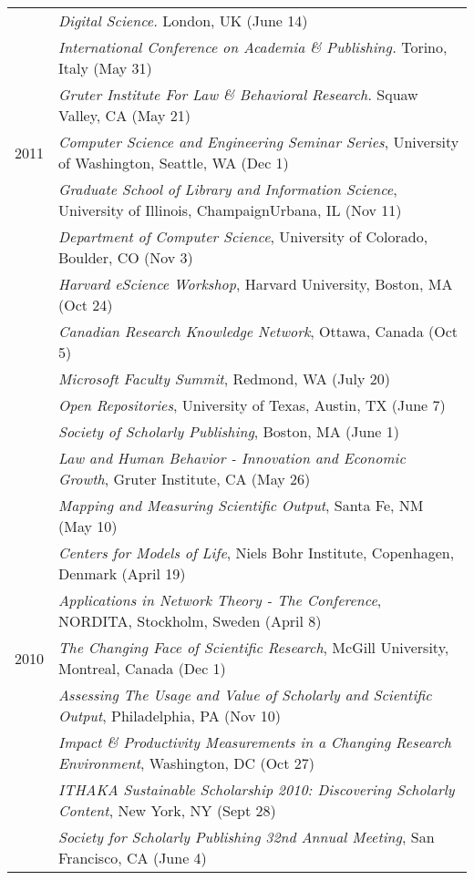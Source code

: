 \documentclass[11pt]{article}
\begin{document}
\begin{longtable}{p{0.5in}|p{5.5in}}
  		&  \textit{Digital Science.} London, UK (June 14) \\
  		&  \textit{International Conference on Academia \& Publishing.} Torino, Italy (May 31) \\
  		&  \textit{Gruter Institute For Law \& Behavioral Research.} Squaw Valley, CA (May 21) \\
  2011  &  \textit{Computer Science and Engineering Seminar Series}, University of Washington, Seattle, WA (Dec 1) \\
  		&  \textit{Graduate School of Library and Information Science}, University of Illinois, Champaign\textemdash Urbana, IL (Nov 11) \\
  		&  \textit{Department of Computer Science}, University of Colorado, Boulder, CO (Nov 3) \\
  		&  \textit{Harvard eScience Workshop}, Harvard University, Boston, MA (Oct 24) \\
  		&  \textit{Canadian Research Knowledge Network}, Ottawa, Canada (Oct 5) \\
  		&  \textit{Microsoft Faculty Summit}, Redmond, WA (July 20) \\
  		&  \textit{Open Repositories}, University of Texas, Austin, TX (June 7) \\
  		&  \textit{Society of Scholarly Publishing}, Boston, MA (June 1) \\
  		&  \textit{Law and Human Behavior - Innovation and Economic Growth}, Gruter Institute, CA (May 26) \\
  		&  \textit{Mapping and Measuring Scientific Output}, Santa Fe, NM (May 10) \\
  		&  \textit{Centers for Models of Life}, Niels Bohr Institute, Copenhagen, Denmark (April 19) \\
  		&  \textit{Applications in Network Theory - The Conference}, NORDITA, Stockholm, Sweden (April 8) \\
  2010 	&  \textit{The Changing Face of Scientific Research}, McGill University, Montreal, Canada (Dec 1) \\
  		&  \textit{Assessing The Usage and Value of Scholarly and Scientific Output}, Philadelphia, PA (Nov 10) \\
  		&  \textit{Impact \& Productivity Measurements in a Changing Research Environment}, Washington, DC (Oct 27) \\
  		&  \textit{ITHAKA Sustainable Scholarship 2010: Discovering Scholarly Content}, New York, NY (Sept 28) \\
  		&  \textit{Society for Scholarly Publishing 32nd Annual Meeting}, San Francisco, CA (June 4) \\

\end{longtable}
\end{document}
